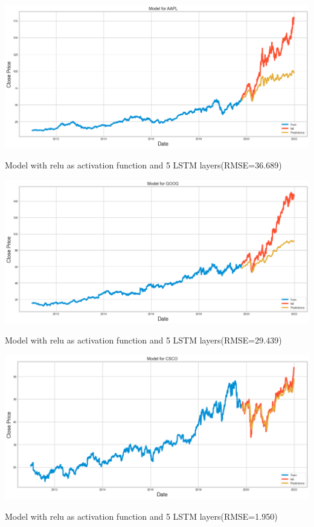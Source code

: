 \begin{center}
    \includegraphics[width=\textwidth]{AAPL_results_02.png}
    \caption{Model with relu as activation function and 5 LSTM layers(RMSE=36.689)}
\end{center}

\begin{center}
    \includegraphics[width=\textwidth]{google_results_02.png}
    \caption{Model with relu as activation function and 5 LSTM layers(RMSE=29.439)}
\end{center}

\begin{center}
    \includegraphics[width=\textwidth]{csco_results_02.png}
    \caption{Model with relu as activation function and 5 LSTM layers(RMSE=1.950)}
\end{center}

